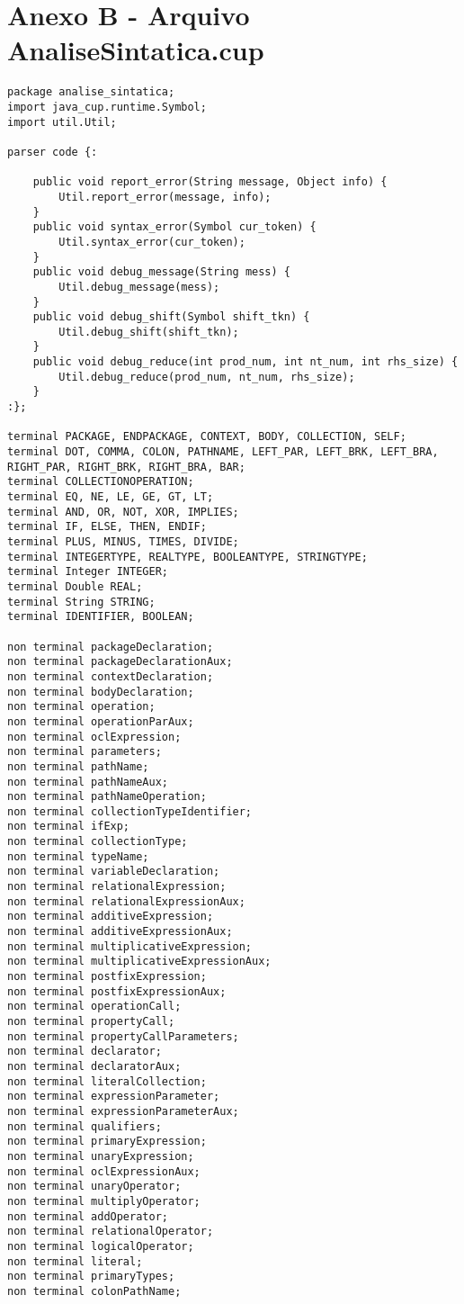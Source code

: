 \section{Anexo B - Arquivo AnaliseSintatica.cup}
\scriptsize
\begin{lstlisting}[frame=single, caption={AnaliseSintatica.cup}]
package analise_sintatica;
import java_cup.runtime.Symbol;
import util.Util;

parser code {:
	
	public void report_error(String message, Object info) {
		Util.report_error(message, info);
	}
	public void syntax_error(Symbol cur_token) {
		Util.syntax_error(cur_token);
	}
	public void debug_message(String mess) {
		Util.debug_message(mess);
	}
	public void debug_shift(Symbol shift_tkn) {
		Util.debug_shift(shift_tkn);
	}
	public void debug_reduce(int prod_num, int nt_num, int rhs_size) {
		Util.debug_reduce(prod_num, nt_num, rhs_size);
	}
:};

terminal PACKAGE, ENDPACKAGE, CONTEXT, BODY, COLLECTION, SELF;
terminal DOT, COMMA, COLON, PATHNAME, LEFT_PAR, LEFT_BRK, LEFT_BRA, RIGHT_PAR, RIGHT_BRK, RIGHT_BRA, BAR;
terminal COLLECTIONOPERATION;
terminal EQ, NE, LE, GE, GT, LT;
terminal AND, OR, NOT, XOR, IMPLIES;
terminal IF, ELSE, THEN, ENDIF;
terminal PLUS, MINUS, TIMES, DIVIDE;
terminal INTEGERTYPE, REALTYPE, BOOLEANTYPE, STRINGTYPE;
terminal Integer INTEGER;
terminal Double REAL;
terminal String STRING;
terminal IDENTIFIER, BOOLEAN;

non terminal packageDeclaration;
non terminal packageDeclarationAux;
non terminal contextDeclaration;
non terminal bodyDeclaration;
non terminal operation;
non terminal operationParAux;
non terminal oclExpression;
non terminal parameters;
non terminal pathName;
non terminal pathNameAux;
non terminal pathNameOperation;
non terminal collectionTypeIdentifier;
non terminal ifExp;
non terminal collectionType;
non terminal typeName;
non terminal variableDeclaration;
non terminal relationalExpression;
non terminal relationalExpressionAux;
non terminal additiveExpression;
non terminal additiveExpressionAux;
non terminal multiplicativeExpression;
non terminal multiplicativeExpressionAux;
non terminal postfixExpression;
non terminal postfixExpressionAux;
non terminal operationCall;
non terminal propertyCall;
non terminal propertyCallParameters;
non terminal declarator;
non terminal declaratorAux;
non terminal literalCollection;
non terminal expressionParameter;
non terminal expressionParameterAux;
non terminal qualifiers;
non terminal primaryExpression;
non terminal unaryExpression;
non terminal oclExpressionAux;
non terminal unaryOperator;
non terminal multiplyOperator; 
non terminal addOperator;
non terminal relationalOperator;
non terminal logicalOperator;
non terminal literal;
non terminal primaryTypes;
non terminal colonPathName;
 

\end{lstlisting}

